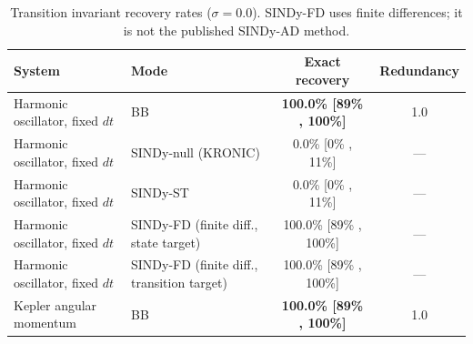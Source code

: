 \documentclass{article}
\begin{document}
\begin{table}[H]
\centering
\caption{Transition invariant recovery rates ($\sigma=0.0$). SINDy-FD uses finite differences; it is not the published SINDy-AD method.}
\label{tab:transition}
\footnotesize
\setlength{\tabcolsep}{4pt}
\begin{tabular}{@{}p{5.0cm}p{4.9cm}cc@{}}
\toprule
\textbf{System} & \textbf{Mode} & \textbf{Exact recovery} & \textbf{Redundancy} \\
\midrule
Harmonic oscillator, fixed $dt$ & BB & \textbf{100.0\% [89\% , 100\%]} & 1.0 \\
Harmonic oscillator, fixed $dt$ & SINDy-null (KRONIC) & 0.0\% [0\% , 11\%] & --- \\
Harmonic oscillator, fixed $dt$ & SINDy-ST & 0.0\% [0\% , 11\%] & --- \\
Harmonic oscillator, fixed $dt$ & SINDy-FD (finite diff., state target) & 100.0\% [89\% , 100\%] & --- \\
Harmonic oscillator, fixed $dt$ & SINDy-FD (finite diff., transition target) & 100.0\% [89\% , 100\%] & --- \\
Kepler angular momentum & BB & \textbf{100.0\% [89\% , 100\%]} & 1.0 \\
\bottomrule
\end{tabular}
\end{table}
\end{document}
